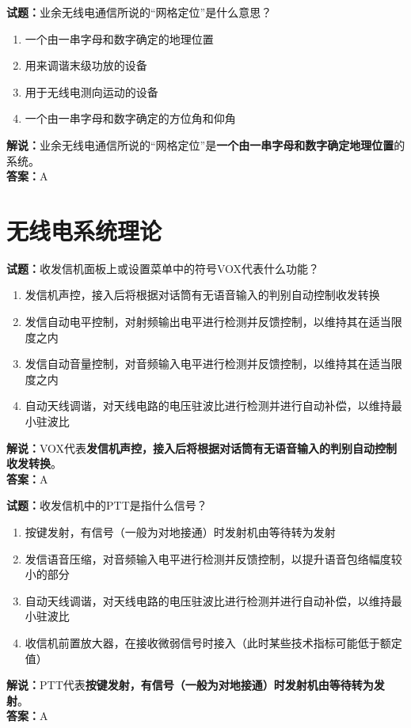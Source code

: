 \documentclass{ctexbook}
\begin{document}
\noindent\textbf{试题：}业余无线电通信所说的“网格定位”是什么意思？
\begin{enumerate}[leftmargin=3em]
	\item 一个由一串字母和数字确定的地理位置
	\item 用来调谐末级功放的设备
	\item 用于无线电测向运动的设备
	\item 一个由一串字母和数字确定的方位角和仰角
\end{enumerate}
\noindent\textbf{解说：}业余无线电通信所说的“网格定位”是\textbf{一个由一串字母和数字确定地理位置}的系统。\\\noindent\textbf{答案：}A






\chapter{无线电系统理论}




\noindent\textbf{试题：}收发信机面板上或设置菜单中的符号VOX代表什么功能？
\begin{enumerate}[leftmargin=3em]
\item 发信机声控，接入后将根据对话筒有无语音输入的判别自动控制收发转换
\item 发信自动电平控制，对射频输出电平进行检测并反馈控制，以维持其在适当限度之内
\item 发信自动音量控制，对音频输入电平进行检测并反馈控制，以维持其在适当限度之内
\item 自动天线调谐，对天线电路的电压驻波比进行检测并进行自动补偿，以维持最小驻波比
\end{enumerate}
\noindent\textbf{解说：}VOX代表\textbf{发信机声控，接入后将根据对话筒有无语音输入的判别自动控制收发转换}。\\\noindent\textbf{答案：}A



\bigskip


\noindent\textbf{试题：}收发信机中的PTT是指什么信号？
\begin{enumerate}[leftmargin=3em]
\item 按键发射，有信号（一般为对地接通）时发射机由等待转为发射
\item 发信语音压缩，对音频输入电平进行检测并反馈控制，以提升语音包络幅度较小的部分
\item 自动天线调谐，对天线电路的电压驻波比进行检测并进行自动补偿，以维持最小驻波比
\item 收信机前置放大器，在接收微弱信号时接入（此时某些技术指标可能低于额定值）
\end{enumerate}
\noindent\textbf{解说：}PTT代表\textbf{按键发射，有信号（一般为对地接通）时发射机由等待转为发射}。\\\noindent\textbf{答案：}A
\end{document}
